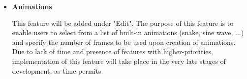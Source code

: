 \documentclass[]{article}
\begin{document}
\begin{itemize}
\begin{itemize}
	\end{itemize}

\item \textbf{Animations}

{This feature will be added under "Edit". The purpose of this feature is to enable users to select from a list of built-in animations (snake, sine wave, ...) and specify the number of frames to be used upon creation of animations. Due to lack of time and presence of features with higher-priorities, implementation of this feature will take place in the very late stages of development, as time permits. }

\end{itemize}
\end{document}
